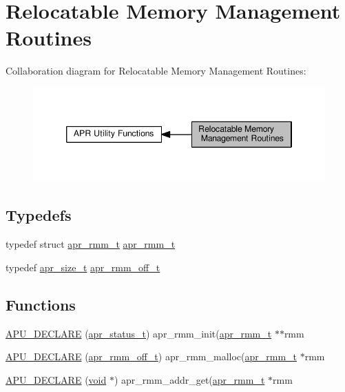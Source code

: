 \hypertarget{group__APR__Util__RMM}{}\section{Relocatable Memory Management Routines}
\label{group__APR__Util__RMM}
Collaboration diagram for Relocatable Memory Management Routines\+:
\nopagebreak
\begin{figure}[H]
\begin{center}
\leavevmode
\includegraphics[width=346pt]{group__APR__Util__RMM}
\end{center}
\end{figure}
\subsection*{Typedefs}
\begin{DoxyCompactItemize}
\item 
typedef struct \hyperlink{structapr__rmm__t}{apr\+\_\+rmm\+\_\+t} \hyperlink{group__APR__Util__RMM_gadb4d418c417ece33c4430ba9df59070a}{apr\+\_\+rmm\+\_\+t}
\item 
typedef \hyperlink{group__apr__platform_gaaa72b2253f6f3032cefea5712a27540e}{apr\+\_\+size\+\_\+t} \hyperlink{group__APR__Util__RMM_ga70b508c81a0bc75350efdefb3410af12}{apr\+\_\+rmm\+\_\+off\+\_\+t}
\end{DoxyCompactItemize}
\subsection*{Functions}
\begin{DoxyCompactItemize}
\item 
\hyperlink{group__APR__Util__RMM_gaa2645d20098f125bc72dd229db627b64}{A\+P\+U\+\_\+\+D\+E\+C\+L\+A\+RE} (\hyperlink{group__apr__errno_gaa5105fa83cc322f09382292db8b47593}{apr\+\_\+status\+\_\+t}) apr\+\_\+rmm\+\_\+init(\hyperlink{structapr__rmm__t}{apr\+\_\+rmm\+\_\+t} $\ast$$\ast$rmm
\item 
\hyperlink{group__APR__Util__RMM_ga816fbaf1e2e831c43acc9990e3f8cd96}{A\+P\+U\+\_\+\+D\+E\+C\+L\+A\+RE} (\hyperlink{group__APR__Util__RMM_ga70b508c81a0bc75350efdefb3410af12}{apr\+\_\+rmm\+\_\+off\+\_\+t}) apr\+\_\+rmm\+\_\+malloc(\hyperlink{structapr__rmm__t}{apr\+\_\+rmm\+\_\+t} $\ast$rmm
\item 
\hyperlink{group__APR__Util__RMM_gad9b913df6926ec4204252ad5540609a4}{A\+P\+U\+\_\+\+D\+E\+C\+L\+A\+RE} (\hyperlink{group__MOD__ISAPI_gacd6cdbf73df3d9eed42fa493d9b621a6}{void} $\ast$) apr\+\_\+rmm\+\_\+addr\+\_\+get(\hyperlink{structapr__rmm__t}{apr\+\_\+rmm\+\_\+t} $\ast$rmm
\end{DoxyCompactItemize}
